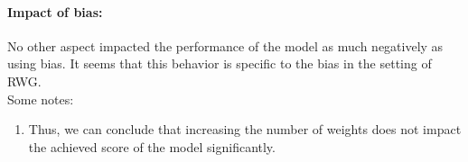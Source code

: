 \paragraph*{Impact of bias:} No other aspect impacted the performance of the model as much negatively as using bias. It seems that this behavior is specific to the bias in the setting of RWG. \\
Some notes:
\begin{enumerate}
  \item Thus, we can conclude that increasing the number of weights does not impact the achieved score of the model significantly.
\end{enumerate}

